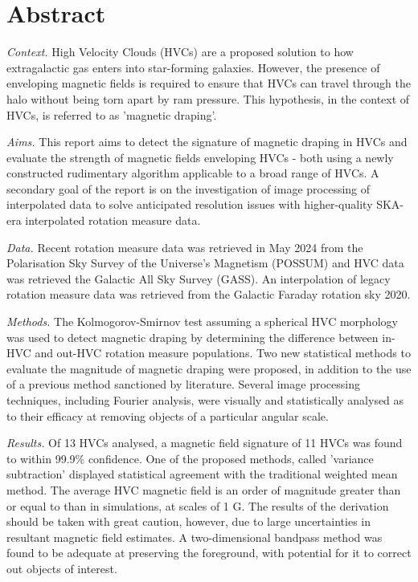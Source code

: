 \chapter*{Abstract}

\noindent\textit{Context.} High Velocity Clouds (HVCs) are a proposed solution to how extragalactic gas enters into star-forming galaxies. However, the presence of enveloping magnetic fields is required to ensure that HVCs can travel through the halo without being torn apart by ram pressure. This hypothesis, in the context of HVCs, is referred to as 'magnetic draping'.

\noindent\textit{Aims.} This report aims to detect the signature of magnetic draping in HVCs and evaluate the strength of magnetic fields enveloping HVCs - both using a newly constructed rudimentary algorithm applicable to a broad range of HVCs. A secondary goal of the report is on the investigation of image processing of interpolated data to solve anticipated resolution issues with higher-quality SKA-era interpolated rotation measure data.

\noindent\textit{Data.} Recent rotation measure data was retrieved in May 2024 from the Polarisation Sky Survey of the Universe's Magnetism (POSSUM) and HVC data was retrieved the Galactic All Sky Survey (GASS). An interpolation of legacy rotation measure data was retrieved from the Galactic Faraday rotation sky 2020.

\noindent\textit{Methods.} The Kolmogorov-Smirnov test assuming a spherical HVC morphology was used to detect magnetic draping by determining the difference between in-HVC and out-HVC rotation measure populations. Two new statistical methods to evaluate the magnitude of magnetic draping were proposed, in addition to the use of a previous method sanctioned by literature. Several image processing techniques, including Fourier analysis, were visually and statistically analysed as to their efficacy at removing objects of a particular angular scale.

\noindent\textit{Results.} Of 13 HVCs analysed, a magnetic field signature of 11 HVCs was found to within 99.9\% confidence. One of the proposed methods, called 'variance subtraction' displayed statistical agreement with the traditional weighted mean method. The average HVC magnetic field is an order of magnitude greater than or equal to than in simulations, at scales of 1 \textmu G. The results of the derivation should be taken with great caution, however, due to large uncertainties in resultant magnetic field estimates. A two-dimensional bandpass method was found to be adequate at preserving the foreground, with potential for it to correct out objects of interest.


